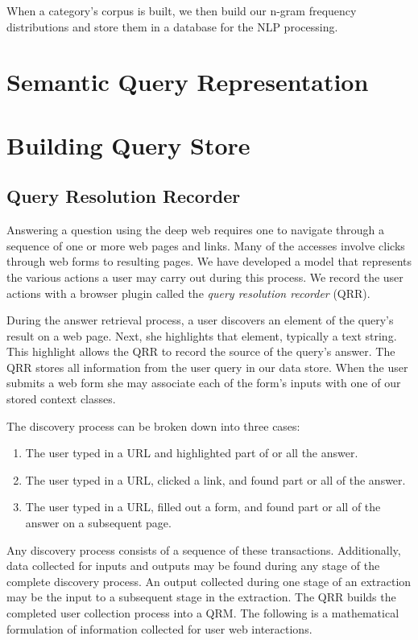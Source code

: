\documentclass{www2010-submission}
\begin{document}
When a category's corpus is built, we then build our n-gram frequency distributions and store them in a database for the NLP processing.

\section{Semantic Query Representation}

\section{Building Query Store}
\subsection{Query Resolution Recorder}
Answering a question using the deep web requires one to navigate through a sequence of one or more web pages and links.  Many of the accesses involve clicks through web forms to resulting pages.  We have developed a model that represents the various actions a user may carry out during this process.  We record the user actions with a browser plugin called the \emph{query resolution recorder} (QRR).

During the answer retrieval process, a user discovers an element of the query's result on a web page.  Next, she highlights that element, typically a text string.  This highlight allows the QRR to record the source of  the query's answer.  The QRR stores all information from the user query in our data store.  When the user submits a web form she may associate each of the form's inputs with one of our stored context classes. 

The discovery process can be broken down into three cases:
\begin{enumerate}
\item The user typed in a URL  and highlighted part of or all the answer. 
\item The user typed in a URL, clicked a link, and found part or all of the answer. 
\item The user typed in a URL, filled out a form, and found part or all of the answer on a subsequent page. 
\end{enumerate}

Any discovery process  consists of a sequence of these transactions.  Additionally, data collected for inputs and outputs may be found during any stage of the complete discovery process.  An output collected during one stage of an extraction may be the input to a subsequent stage in the extraction.  The QRR builds the completed user collection process into a QRM.  The following is a mathematical formulation of information collected for user web interactions.\\
\end{document}
